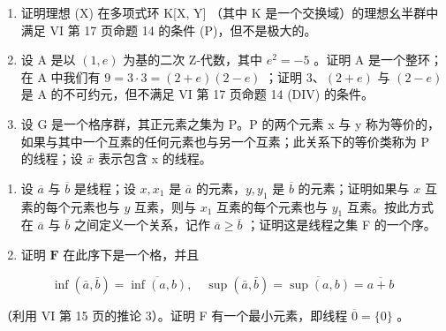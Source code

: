 \begin{enumerate}
\def\labelenumi{\arabic{enumi})}
\setcounter{enumi}{25}
\item
  证明理想 (X) 在多项式环 K{[}X, Y{]} （其中 K 是一个交换域）的理想幺半群中满足 VI 第 17 页命题 14 的条件 (P)，但不是极大的。
\item
  设 A 是以 \((1, e)\) 为基的二次 Z-代数，其中 \(e^{2} = -5\) 。证明 A 是一个整环；在 A 中我们有 \(9 = 3 \cdot 3 = (2 + e)(2 - e)\) ；证明 3、\((2 + e)\) 与 \((2 - e)\) 是 A 的不可约元，但不满足 VI 第 17 页命题 14 (DIV) 的条件。
\item
  设 G 是一个格序群，其正元素之集为 P。P 的两个元素 x 与 y 称为等价的，如果与其中一个互素的任何元素也与另一个互素；此关系下的等价类称为 P 的线程；设 \(\bar{x}\) 表示包含 x 的线程。
\end{enumerate}

\begin{enumerate}
\def\labelenumi{\alph{enumi})}
\item
  设 \(\overline{a}\) 与 \(\overline{b}\) 是线程；设 \(x, x_1\) 是 \(\overline{a}\) 的元素，\(y, y_1\) 是 \(\overline{b}\) 的元素；证明如果与 \(x\) 互素的每个元素也与 \(y\) 互素，则与 \(x_1\) 互素的每个元素也与 \(y_1\) 互素。按此方式在 \(\overline{a}\) 与 \(\overline{b}\) 之间定义一个关系，记作 \(\overline{a} \geqslant \overline{b}\) ；证明这是线程之集 F 的一个序。
\item
  证明 \(\mathbf{F}\) 在此序下是一个格，并且
\end{enumerate}

\[
\inf (\bar {a}, \bar {b}) = \overline {{\inf (a , b)}}, \quad \sup (\bar {a}, \bar {b}) = \overline {{\sup (a , b)}} = \overline {{a + b}}
\]

（利用 VI 第 15 页的推论 3）。证明 F 有一个最小元素，即线程 \(\overline{0} = \{0\}\) 。

